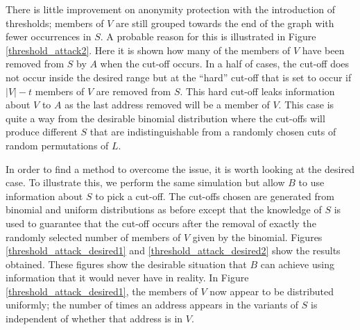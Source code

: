 \documentclass[ %
                    author={Luke Murray},
                supervisor={Dr. Simon Hollis},
                     title={Shadow Peer-to-Peer Networks},
                  subtitle={},
                    degree={MEng},
                      year={2013} ]{thesis}
\begin{document}
There is little improvement on anonymity protection with the introduction of thresholds; members of $V$ are still grouped towards the end of the graph with fewer occurrences in $S$. A probable reason for this is illustrated in Figure \ref{threshold_attack2}. Here it is shown how many of the members of $V$ have been removed from $S$ by $A$ when the cut-off occurs. In a half of cases, the cut-off does not occur inside the desired range but at the ``hard'' cut-off that is set to occur if $|V| - t$ members of $V$ are removed from $S$. This hard cut-off leaks information about $V$ to $A$ as the last address removed will be a member of $V$. This case is quite a way from the desirable binomial distribution where the cut-offs will produce different $S$ that are indistinguishable from a randomly chosen cuts of random permutations of $L$.

In order to find a method to overcome the issue, it is worth looking at the desired case. To illustrate this, we perform the same simulation but allow $B$ to use information about $S$ to pick a cut-off. The cut-offs chosen are generated from binomial and uniform distributions as before except that the knowledge of $S$ is used to guarantee that the cut-off occurs after the removal of exactly the randomly selected number of members of $V$ given by the binomial. Figures \ref{threshold_attack_desired1} and \ref{threshold_attack_desired2} show the results obtained. These figures show the desirable situation that $B$ can achieve using information that it would never have in reality. In Figure \ref{threshold_attack_desired1}, the members of $V$ now appear to be distributed uniformly; the number of times an address appears in the variants of $S$ is independent of whether that address is in $V$.
\end{document}
